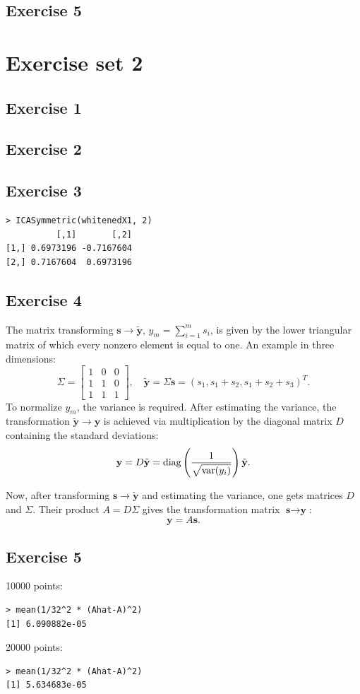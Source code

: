 \documentclass{article}
\begin{document}
\subsection{Exercise 5}

\section{Exercise set 2}

\subsection{Exercise 1}
\subsection{Exercise 2}
\subsection{Exercise 3}
\begin{verbatim}
> ICASymmetric(whitenedX1, 2)
          [,1]       [,2]
[1,] 0.6973196 -0.7167604
[2,] 0.7167604  0.6973196
\end{verbatim}
\subsection{Exercise 4}
The matrix transforming $\textbf{s} \to \tilde{\textbf{y}}$, $y_m = \sum_{i=1}^m s_i$, is given by
the lower triangular matrix of which every nonzero element is equal to
one. An example in three dimensions:
\[
\Sigma =
\left[ \begin{array}{ccc}
1 & 0 & 0 \\
1 & 1 & 0 \\
1 & 1 & 1 \end{array} \right],
\quad
\tilde{\textbf{y}} = \Sigma \textbf{s} = (s_1, s_1 + s_2, s_1 + s_2 + s_3)^T.
\]
To normalize $y_m$, the variance is required. After estimating
the variance, the transformation $\tilde{\textbf{y}} \to \textbf{y}$
is achieved via multiplication by the diagonal matrix $D$ containing the
standard deviations: 
\[
\textbf{y} = D \tilde{\textbf{y}}= \textup{diag} \left( \frac{1}{\sqrt{\textup{var}(y_i)}}
\right) \tilde{\textbf{y}}.
\]

Now, after transforming $\textbf{s} \to \tilde{\textbf{y}}$ and
estimating the variance, one gets matrices $D$ and $\Sigma$. Their
product $A = D \Sigma$ gives the transformation matrix $\textbf{s} \to
\textbf{y}$:
\[
\textbf{y} = A\textbf{s}.
\]
\subsection{Exercise 5}
10000 points:
\begin{verbatim}
> mean(1/32^2 * (Ahat-A)^2)
[1] 6.090882e-05
\end{verbatim}
20000 points:
\begin{verbatim}
> mean(1/32^2 * (Ahat-A)^2)
[1] 5.634683e-05
\end{verbatim}
\end{document}

